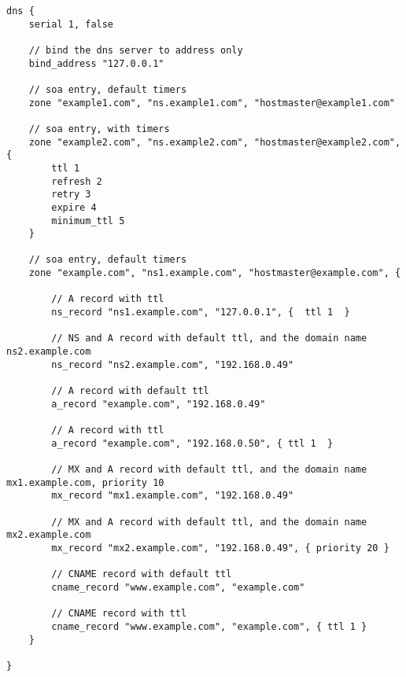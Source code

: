 \begin{lstlisting}[style=Java,label=lst:dns_example_script,caption=Dns Example Script]
dns {
    serial 1, false

    // bind the dns server to address only
    bind_address "127.0.0.1"

    // soa entry, default timers
    zone "example1.com", "ns.example1.com", "hostmaster@example1.com"

    // soa entry, with timers
    zone "example2.com", "ns.example2.com", "hostmaster@example2.com", {
        ttl 1
        refresh 2
        retry 3
        expire 4
        minimum_ttl 5
    }

    // soa entry, default timers
    zone "example.com", "ns1.example.com", "hostmaster@example.com", {

        // A record with ttl
        ns_record "ns1.example.com", "127.0.0.1", {  ttl 1  }

        // NS and A record with default ttl, and the domain name ns2.example.com
        ns_record "ns2.example.com", "192.168.0.49"

        // A record with default ttl
        a_record "example.com", "192.168.0.49"

        // A record with ttl
        a_record "example.com", "192.168.0.50", { ttl 1  }

        // MX and A record with default ttl, and the domain name mx1.example.com, priority 10
        mx_record "mx1.example.com", "192.168.0.49"

        // MX and A record with default ttl, and the domain name mx2.example.com
        mx_record "mx2.example.com", "192.168.0.49", { priority 20 }

        // CNAME record with default ttl
        cname_record "www.example.com", "example.com"

        // CNAME record with ttl
        cname_record "www.example.com", "example.com", { ttl 1 }
    }

}
\end{lstlisting}
